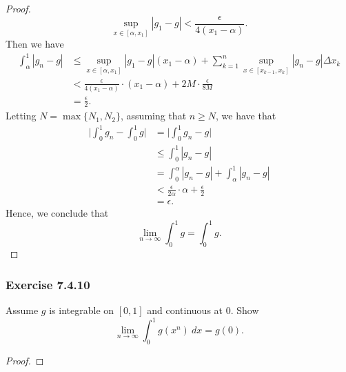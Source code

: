 \begin{proof}
\[ \sup_{x \in [\alpha, x_{1}]} | g_{1} - g  | < \frac{ \epsilon  }{ 4 (x_{1} - \alpha) } .  \]
Then we have 
\begin{align*}
	\int_{ \alpha }^{ 1 }  | g_{n} -g  |  &\leq \sup_{x \in [\alpha, x_{1}]} | g_{1} - g  | (x_{1} - \alpha) + \sum_{ k=1 }^{ n } \sup_{x\in [x_{k-1},x_{k }]} | g_{n} -g  | \Delta x_{k }  \\
										  &< \frac{ \epsilon  }{ 4 ( x_{1} - \alpha) } \cdot (x_{1} - \alpha) + 2M \cdot \frac{ \epsilon  }{ 8M  } \\ 
										  &= \frac{ \epsilon  }{ 2 }.
\end{align*}
Letting \( N = \max \{ N_{1}, N_{2} \}  \), assuming that \( n \geq N   \), we have that 
\begin{align*}
    \Big| \int_{ 0 }^{ 1 } g_{n} - \int_{ 0 }^{ 1 } g  \Big| &= \Big| \int_{ 0 }^{ 1 } g_{n} - g   \Big|  \\
															 &\leq \int_{ 0 }^{ 1 } | g_{n} - g  |  \\
															 &= \int_{ 0 }^{ \alpha } | g_{n} - g |  + \int_{ \alpha  }^{ 1 }  | g_{n} - g  | \\ 
															 &< \frac{ \epsilon  }{ 2 \alpha } \cdot \alpha + \frac{ \epsilon  }{ 2  } \\
															 &= \epsilon.
\end{align*}
Hence, we conclude that
\[  \lim_{ n \to \infty  }  \int_{ 0 }^{ 1 } g  = \int_{ 0 }^{ 1 } g.  \]
\end{proof}


\subsubsection{Exercise 7.4.10} Assume \( g  \) is integrable on \( [0,1]  \) and continuous at \( 0  \). Show 
\[  \lim_{ n \to \infty  } \int_{ 0 }^{ 1 }  g(x^{n}) \ dx = g(0). \]
\begin{proof}
\end{proof}



